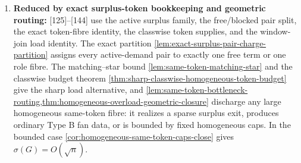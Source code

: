 \documentclass[11pt]{article}
\begin{document}
\begin{enumerate}[label=\arabic*., leftmargin=1.8em]
\item \textbf{Reduced by exact surplus-token bookkeeping and geometric routing:} {[125]}--{[144]} use the active surplus family, the free/blocked pair split, the exact token-fibre identity, the classwise token supplies, and the window-join load identity.  The exact partition \cref{lem:exact-surplus-pair-charge-partition} assigns every active-demand pair to exactly one free term or one role fibre.  The matching--star bound \cref{lem:same-token-matching-star} and the classwise budget theorem \cref{thm:sharp-classwise-homogeneous-token-budget} give the sharp load alternative, and \cref{lem:same-token-bottleneck-routing,thm:homogeneous-overload-geometric-closure} discharge any large homogeneous same-token fibre: it realizes a sparse surplus exit, produces ordinary Type B fan data, or is bounded by fixed homogeneous caps.  In the bounded case \cref{cor:homogeneous-same-token-caps-close} gives \(\sigma(G)=O(\sqrt n)\).
\end{enumerate}
\end{document}
